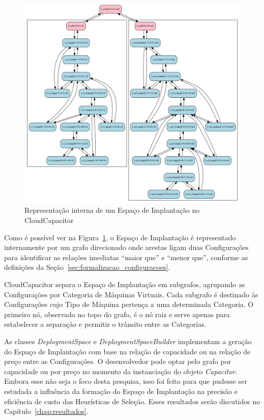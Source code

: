 \begin{figure}[htb]
  \caption{\label{fig:depspace_real}Representação interna de um Espaço de Implantação no CloudCapacitor}
  \begin{center}
    \includegraphics[scale=0.35]{img/exemplo_grafo_espaco_implantacao}
  \end{center}
\end{figure}

Como é possível ver na Figura~\ref{fig:depspace_real}, o Espaço de Implantação é 
representado internamente por um grafo direcionado onde arestas ligam duas 
Configurações para identificar as relações imediatas ``maior que'' e ``menor que'', 
conforme as definições da Seção~\ref{sec:formalizacao_configuracoes}. 

CloudCapacitor separa o Espaço de Implantação em subgrafos, agrupando as
Configurações por Categoria de Máquinas Virtuais. Cada subgrafo é destinado às
Configurações cujo Tipo de Máquina pertença a uma determinada Categoria. O primeiro
nó, observado no topo do grafo, é o nó raiz e serve apenas para estabelecer a 
separação e permitir o trânsito entre as Categorias.

As classes \emph{DeploymentSpace} e \emph{DeploymentSpaceBuilder} implementam
a geração do Espaço de Implantação com base na relação de capacidade ou na relação
de preço entre as Configurações. O desenvolvedor pode optar pelo grafo por capacidade ou por preço no momento da
instanciação do objeto \emph{Capacitor}. Embora esse não seja o foco desta 
pesquisa, isso foi feito para que pudesse ser estudada a influência da formação 
do Espaço de Implantação na precisão e eficiência de custo das Heurísticas de 
Seleção. Esses resultados serão discutidos no Capítulo~\ref{chap:resultados}.

